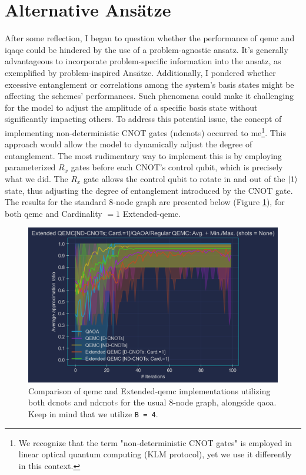 \vspace*{-1cm}
\section{Alternative Ansätze}
\label{section:Alternative_ansätze}

After some reflection, I began to question whether the performance of \acrshort{qemc} and \acrshort{iqaqe} could be hindered by the use of a problem-agnostic ansatz. It's generally advantageous to incorporate problem-specific information into the ansatz, as exemplified by problem-inspired Ansätze. Additionally, I pondered whether excessive entanglement or correlations among the system's basis states might be affecting the schemes' performances. Such phenomena could make it challenging for the model to adjust the amplitude of a specific basis state without significantly impacting others. To address this potential issue, the concept of implementing non-deterministic CNOT gates (\acrshort{ndcnot}\textcolor{gray}{s}) occurred to me\footnote{We recognize that the term "non-deterministic CNOT gates" is employed in linear optical quantum computing (KLM protocol), yet we use it differently in this context.}. This approach would allow the model to dynamically adjust the degree of entanglement. The most rudimentary way to implement this is by employing parameterized $R_x$ gates before each CNOT's control qubit, which is precisely what we did. The $R_x$ gate allows the control qubit to rotate in and out of the $\ket{1}$ state, thus adjusting the degree of entanglement introduced by the CNOT gate. The results for the standard $8$-node graph are presented below (Figure \ref{fig:ND-CNOTs}), for both \acrshort{qemc} and Cardinality $= 1$ Extended-\acrshort{qemc}.
\begin{figure}[h]
  \centering
  \includegraphics[width=1.0\textwidth]{Figures/Chapter_5/Extended-QEMC/8-node[ND-CNOTs; Card.=1](n_layers=2, step_size=0.5).png}
  \caption{Comparison of \acrshort{qemc} and Extended-\acrshort{qemc} implementations utilizing both \acrshort{dcnot}\textcolor{gray}{s} and \acrshort{ndcnot}\textcolor{gray}{s} for the usual $8$-node graph, alongside \acrshort{qaoa}. Keep in mind that we utilize \texttt{B = 4}.}
  \label{fig:ND-CNOTs}
\end{figure}

